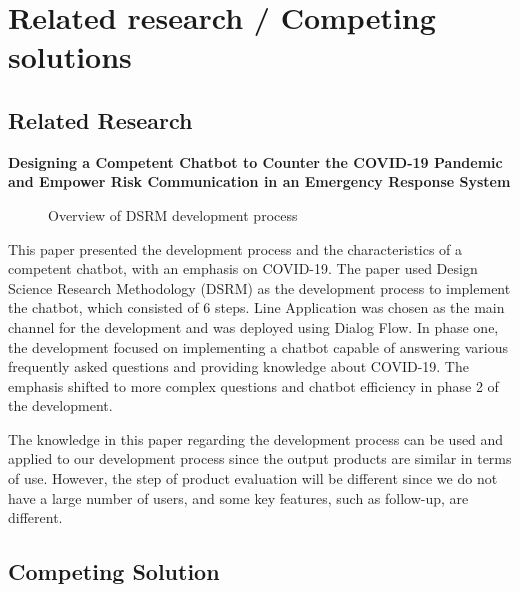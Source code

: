 \documentclass[12pt,oneside,openright,a4paper]{cpe-english-project}
\begin{document}
  \section{Related research / Competing solutions}
    \subsection{Related Research}
      \qquad \textbf{Designing a Competent Chatbot to Counter the COVID-19 Pandemic and Empower Risk Communication in an Emergency Response System}\par
      \begin{figure}[!h]
        \centering
        \caption{Overview of DSRM development process}\label{fig:Research_1}
      \end{figure}
      \qquad This paper presented the development process and the characteristics of a competent chatbot, with an emphasis on COVID-19. The paper used Design Science Research Methodology (DSRM) as the development process to implement the chatbot, which consisted of 6 steps. Line Application was chosen as the main channel for the development and was deployed using Dialog Flow. In phase one, the development focused on implementing a chatbot capable of answering various frequently asked questions and providing knowledge about COVID-19. The emphasis shifted to more complex questions and chatbot efficiency in phase 2 of the development.\par
      \qquad The knowledge in this paper regarding the development process can be used and applied to our development process since the output products are similar in terms of use. However, the step of product evaluation will be different since we do not have a large number of users, and some key features, such as follow-up, are different.\par
    \subsection{Competing Solution}
\end{document}

